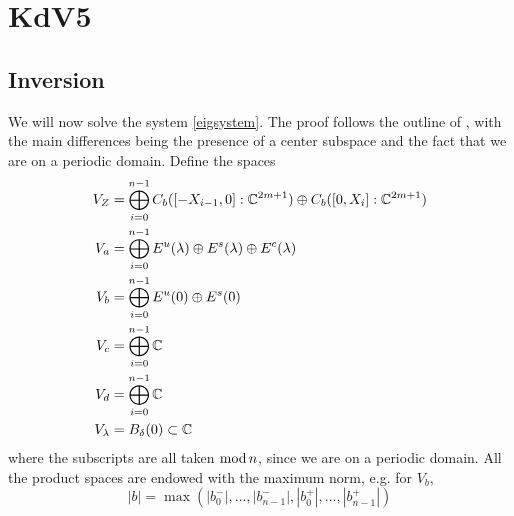 \documentclass[thesis.tex]{subfiles}
\begin{document}
\iffulldocument\else
	\chapter{KdV5}
\fi

\section{Inversion}

We will now solve the system \cref{eigsystem}. The proof follows the outline of \cite[Theorem 2]{Sandstede1998}, with the main differences being the presence of a center subspace and the fact that we are on a periodic domain. Define the spaces
\begin{align*}
V_Z &= \bigoplus_{i=0}^{n-1} C_b([-X_{i-1},0]:\mathbb{C}^{2m+1}) \oplus C_b([0,X_i]:\mathbb{C}^{2m+1})  \\
V_a &= \bigoplus_{i=0}^{n-1} E^u(\lambda) \oplus E^s(\lambda) \oplus E^c(\lambda) \\
V_b &= \bigoplus_{i=0}^{n-1} E^u(0) \oplus E^s(0) \\
V_c &= \bigoplus_{i=0}^{n-1} \mathbb{C} \\
V_d &= \bigoplus_{i=0}^{n-1} \mathbb{C} \\
V_\lambda &= B_\delta(0) \subset \mathbb{C}
\end{align*}
where the subscripts are all taken $\mathop\mathrm{mod}\nolimits n$, since we are on a periodic domain. All the product spaces are endowed with the maximum norm, e.g. for $V_b$, 
\[
|b| = \max(|b_0^-|, \dots, |b_{n-1}^-|, |b_0^+|, \dots, |b_{n-1}^+|)
\]
\end{document}
